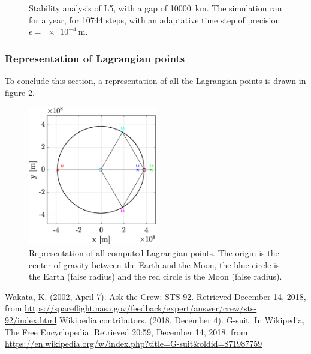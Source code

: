 \documentclass[a4paper,12pt,twoside]{article}
\begin{document}
\begin{figure}[h]
  \caption{Stability analysis of L5, with a gap of \SI{10000}{\km}. The simulation ran for a year, for \num{10744} steps, with an adaptative time step of precision $\epsilon = \SI{e-4}{\m}$.}
  \label{fig:7b_L5}
\end{figure}




\subsubsection{Representation of Lagrangian points}
To conclude this section, a representation of all the Lagrangian points is drawn in figure \ref{fig:7b_allLPoints}.


\begin{figure}[h]
  \centering
  \includegraphics[width=0.5\textwidth]{graphs/ex7b_allLPoints.eps}
  \caption{Representation of all computed Lagrangian points. The origin is the center of gravity between the Earth and the Moon, the blue circle is the Earth (false radius) and the red circle is the Moon (false radius).}
  \label{fig:7b_allLPoints}
\end{figure}






\begin{thebibliography}{99}
   Wakata, K. (2002, April 7). Ask the Crew: STS-92. Retrieved December 14, 2018, from \url{https://spaceflight.nasa.gov/feedback/expert/answer/crew/sts-92/index.html}
   Wikipedia contributors. (2018, December 4). G-suit. In Wikipedia, The Free Encyclopedia. Retrieved 20:59, December 14, 2018, from \url{https://en.wikipedia.org/w/index.php?title=G-suit&oldid=871987759}
\end{thebibliography}
\end{document}
